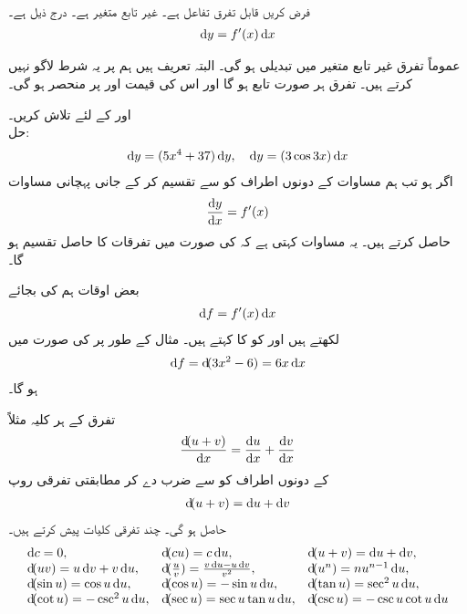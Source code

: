 \\
فرض کریں  قابل تفرق تفاعل ہے۔   غیر تابع متغیر ہے۔   درج ذیل ہے۔
\begin{align*}
\dif y=f'(x)\dif x
\end{align*}

عموماً تفرق  غیر تابع متغیر میں تبدیلی ہو گی۔ البتہ تعریف ہیں ہم پر یہ شرط لاگو نہیں کرتے ہیں۔ تفرق  ہر صورت تابع ہو گا اور اس کی قیمت  اور  پر منحصر ہو گی۔

 اور  کے لئے  تلاش کریں۔\\
حل:
\begin{align*}
\dif y=(5x^4+37)\dif y,\quad \dif y=(3\cos 3x)\dif x
\end{align*}
اگر  ہو تب ہم مساوات  کے دونوں اطراف کو  سے تقسیم کر کے جانی پہچانی مساوات
\begin{align*}
\frac{\dif y}{\dif x}=f'(x)
\end{align*}
حاصل کرتے ہیں۔ یہ مساوات کہتی ہے کہ  کی صورت میں  تفرقات کا حاصل تقسیم ہو گا۔

بعض اوقات ہم  کی بجائے 
\begin{align*}
\dif f=f'(x)\dif x
\end{align*}
لکھتے ہیں اور  کو  کا  کہتے ہیں۔ مثال کے طور پر  کی صورت میں
\begin{align*}
\dif f=\dif (3x^2-6)=6x\dif x
\end{align*}
ہو گا۔

تفرق کے ہر کلیہ مثلاً
\begin{align*}
\frac{\dif(u+v)}{\dif x}=\frac{\dif u}{\dif x}+\frac{\dif v}{\dif x}
\end{align*}
 کے دونوں اطراف کو  سے ضرب دے کر مطابقتی تفرقی روپ
\begin{align*}
\dif (u+v)=\dif u+\dif v
\end{align*}
حاصل ہو گی۔ چند تفرقی کلیات پیش کرتے ہیں۔
\begin{align*}
\begin{array}{lll}
\dif c=0,&\dif (cu)=c\dif u,&\dif (u+v)=\dif u+\dif v,\\
\dif(uv)=u\dif v+v\dif u,&\dif(\tfrac{u}{v})=\frac{v\dif u-u\dif v}{v^2},&\dif (u^n)=nu^{n-1}\dif u,\\
\dif(\sin u)=\cos u\dif u,&\dif (\cos u)=-\sin u \dif u,&\dif (\tan u)=\sec^2u\dif u,\\
\dif (\cot u)=-\csc^2u\dif u,&\dif(\sec u)=\sec u\tan u\dif u,&\dif(\csc u)=-\csc u\cot u\dif u
\end{array}
\end{align*}

